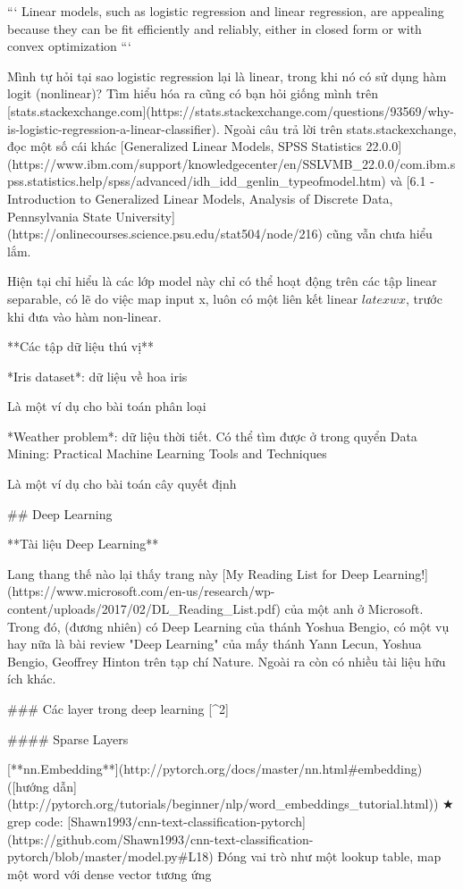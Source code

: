```
Linear models, such as logistic regression and linear
regression, are appealing because they can be ﬁt
eﬃciently and reliably, either in closed form or
with convex optimization
```

Mình tự hỏi tại sao logistic regression lại là linear, trong khi nó có sử dụng hàm logit (nonlinear)? Tìm hiểu hóa ra cũng có bạn hỏi giống mình trên [stats.stackexchange.com](https://stats.stackexchange.com/questions/93569/why-is-logistic-regression-a-linear-classifier). Ngoài câu trả lời trên stats.stackexchange, đọc một số cái khác [Generalized Linear Models, SPSS Statistics 22.0.0](https://www.ibm.com/support/knowledgecenter/en/SSLVMB_22.0.0/com.ibm.spss.statistics.help/spss/advanced/idh_idd_genlin_typeofmodel.htm)
 và [6.1 - Introduction to Generalized Linear Models, Analysis of Discrete Data, Pennsylvania State University](https://onlinecourses.science.psu.edu/stat504/node/216) cũng vẫn chưa hiểu lắm.

Hiện tại chỉ hiểu là các lớp model này chỉ có thể hoạt động trên các tập linear separable, có lẽ do việc map input x, luôn có một liên kết linear $latex wx$, trước khi đưa vào hàm non-linear.

**Các tập dữ liệu thú vị**

*Iris dataset*: dữ liệu về hoa iris

Là một ví dụ cho bài toán phân loại

*Weather problem*: dữ liệu thời tiết. Có thể tìm được ở trong quyển Data Mining: Practical Machine Learning Tools and Techniques

Là một ví dụ cho bài toán cây quyết định

## Deep Learning

**Tài liệu Deep Learning**

Lang thang thế nào lại thấy trang này [My Reading List for Deep Learning!](https://www.microsoft.com/en-us/research/wp-content/uploads/2017/02/DL_Reading_List.pdf) của một anh ở Microsoft. Trong đó, (đương nhiên) có Deep Learning của thánh Yoshua Bengio, có một vụ hay nữa là bài review "Deep Learning" của mấy thánh Yann Lecun, Yoshua Bengio, Geoffrey Hinton trên tạp chí Nature. Ngoài ra còn có nhiều tài liệu hữu ích khác.

### Các layer trong deep learning [^2]

#### Sparse Layers

[**nn.Embedding**](http://pytorch.org/docs/master/nn.html#embedding) ([hướng dẫn](http://pytorch.org/tutorials/beginner/nlp/word_embeddings_tutorial.html))
★ grep code: [Shawn1993/cnn-text-classification-pytorch](https://github.com/Shawn1993/cnn-text-classification-pytorch/blob/master/model.py#L18)
Đóng vai trò như một lookup table, map một word với dense vector tương ứng

